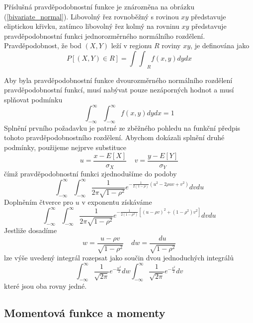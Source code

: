 Příslušná pravděpodobnostní funkce je znározněna na obrázku (\ref{bivariate_normal}). Libovolný řez rovnoběžný s rovinou $xy$ představuje eliptickou křivku, zatímco libovolný řez kolmý na rovninu $xy$ představuje pravděpodobnostní funkci jednorozměrného normálního rozdělení. Pravděpodobnost, že bod $(X,Y)$ leží v regionu $R$ roviny $xy$, je definována jako
\begin{equation*}
P[(X,Y) \in R] = {\int \int}_R f(x,y)dy dx
\end{equation*}

Aby byla pravděpodobnostní funkce dvourozměrného normálního rozdělení pravděpodobnostní funkcí, musí nabývat pouze nezáporných hodnot a musí splňovat podmínku
\begin{equation*}
\int_{-\infty}^{\infty} \int_{-\infty}^{\infty} f(x,y) dy dx = 1
\end{equation*}
Splnění prvního požadavku je patrné ze zběžného pohledu na funkční předpis tohoto pravděpodobnostního rozdělení. Abychom dokázali splnění druhé podmínky, použijeme nejprve substituce
\begin{equation*}
u = \frac{x - E[X]}{\sigma_X}~~~~~v = \frac{y - E[Y]}{\sigma_Y}
\end{equation*}
čímž pravděpodobnostní funkci zjednodušíme do podoby
\begin{equation*}
\int_{-\infty}^{\infty} \int_{-\infty}^{\infty} \frac{1}{2 \pi \sqrt{1 - \rho^2}} e^{-\frac{1}{2(1 - \rho)}(u^2 - 2 \rho u v + v^2)}dv du
\end{equation*}
Doplněním čtverce pro $u$ v exponentu získáváme
\begin{equation*}
\int_{-\infty}^{\infty} \int_{-\infty}^{\infty} \frac{1}{2 \pi \sqrt{1 - \rho^2}}e^{-\frac{1}{2(1 - \rho^2)}[(u - \rho v)^2 + (1 - \rho^2)v^2]}dv du
\end{equation*}
Jestliže dosadíme
\begin{equation*}
w = \frac{u - \rho v}{\sqrt{1 - \rho^2}}~~~~~dw = \frac{du}{\sqrt{1 - \rho^2}}
\end{equation*}
lze výše uvedený integrál rozepsat jako součin dvou jednoduchých integrálů
\begin{equation*}
\int_{-\infty}^{\infty} \frac{1}{\sqrt{2 \pi}}e^{-\frac{w^2}{2}}dw \int_{-\infty}^{\infty} \frac{1}{\sqrt{2 \pi}}e^{-\frac{v^2}{2}}dv
\end{equation*}
které jsou oba rovny jedné.

\subsection{Momentová funkce a momenty}

